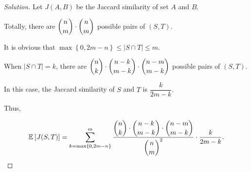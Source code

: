 \documentclass{article}
\newenvironment{solution}{\begin{proof}[\noindent\it Solution]}{\end{proof}}
\newcommand{\staExp}[2]{\mathbb{E}_{#1}\left[#2\right]}
\begin{document}
\begin{solution}
    Let $J(A,B)$ be the Jaccard similarity of set $A$ and $B$.

    \vspace{0.5em} \hspace{2.5em}
    Totally, there are $\dbinom{n}{m}\cdot\dbinom{n}{m}$ possible pairs of $(S,T)$.

    \vspace{0.5em} \hspace{2.5em}
    It is obvious that $\max\left\{0,2m-n\right\}\le |S\cap T| \le m.$
    
    \vspace{0.5em} \hspace{2.5em}
    When $|S\cap T|=k$, there are $\dbinom{n}{k}\cdot\dbinom{n-k}{m-k}\cdot\dbinom{n-m}{m-k}$ possible pairs of $(S,T)$. 
    
    \vspace{0.5em} \hspace{2.5em}
    In this case, the Jaccard similarity of $S$ and $T$ is $\dfrac{k}{2m-k}.$


    \hspace{2.5em}
    Thus,
    
    \vspace{-1em}
    \begin{align*}
        \staExp{}{J(S,T)} = \sum_{k=\max\left\{0,2m-n\right\}}^{m}\frac{\dbinom{n}{k}\cdot\dbinom{n-k}{m-k}\cdot\dbinom{n-m}{m-k}}{\dbinom{n}{m}^2}\cdot\frac{k}{2m-k}.
    \end{align*}

    




\end{solution}

\end{document}
